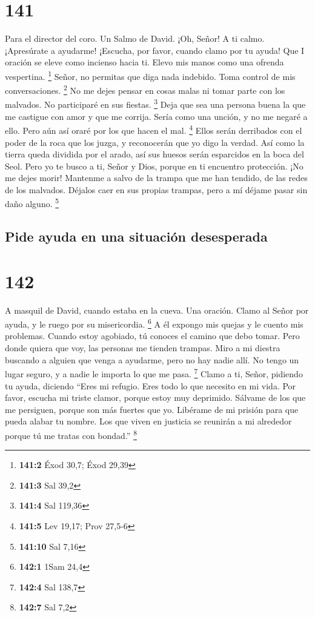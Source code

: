 \hypertarget{section-140}{%
\section{141}\label{section-140}}

Para el director del coro. Un Salmo de David.  ¡Oh, Señor! A
ti calmo. ¡Apresúrate a ayudarme! ¡Escucha, por favor, cuando clamo por
tu ayuda!  Que I oración se eleve como incienso hacia ti.
Elevo mis manos como una ofrenda vespertina. \footnote{\textbf{141:2}
  Éxod 30,7; Éxod 29,39}  Señor, no permitas que diga nada
indebido. Toma control de mis conversaciones. \footnote{\textbf{141:3}
  Sal 39,2}  No me dejes pensar en cosas malas ni tomar
parte con los malvados. No participaré en sus fiestas. \footnote{\textbf{141:4}
  Sal 119,36}  Deja que sea una persona buena la que me
castigue con amor y que me corrija. Sería como una unción, y no me
negaré a ello. Pero aún así oraré por los que hacen el mal. \footnote{\textbf{141:5}
  Lev 19,17; Prov 27,5-6}  Ellos serán derribados con el
poder de la roca que los juzga, y reconocerán que yo digo la verdad.
 Así como la tierra queda dividida por el arado, así sus
huesos serán esparcidos en la boca del Seol.  Pero yo te
busco a ti, Señor y Dios, porque en ti encuentro protección. ¡No me
dejes morir!  Mantenme a salvo de la trampa que me han
tendido, de las redes de los malvados.  Déjalos caer en sus
propias trampas, pero a mí déjame pasar sin daño alguno. \footnote{\textbf{141:10}
  Sal 7,16}

\hypertarget{pide-ayuda-en-una-situaciuxf3n-desesperada}{%
\subsection{Pide ayuda en una situación
desesperada}\label{pide-ayuda-en-una-situaciuxf3n-desesperada}}

\hypertarget{section-141}{%
\section{142}\label{section-141}}

A masquil de David, cuando estaba en la cueva. Una oración. 
Clamo al Señor por ayuda, y le ruego por su misericordia. \footnote{\textbf{142:1}
  1Sam 24,4}  A él expongo mis quejas y le cuento mis
problemas.  Cuando estoy agobiado, tú conoces el camino que
debo tomar. Pero donde quiera que voy, las personas me tienden trampas.
 Miro a mi diestra buscando a alguien que venga a ayudarme,
pero no hay nadie allí. No tengo un lugar seguro, y a nadie le importa
lo que me pasa. \footnote{\textbf{142:4} Sal 138,7}  Clamo a
ti, Señor, pidiendo tu ayuda, diciendo ``Eres mi refugio. Eres todo lo
que necesito en mi vida.  Por favor, escucha mi triste
clamor, porque estoy muy deprimido. Sálvame de los que me persiguen,
porque son más fuertes que yo.  Libérame de mi prisión para
que pueda alabar tu nombre. Los que viven en justicia se reunirán a mi
alrededor porque tú me tratas con bondad.'' \footnote{\textbf{142:7} Sal
  7,2}

